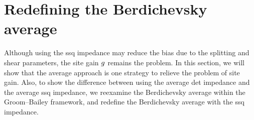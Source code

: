 \begin{comment}
		 The contribution from the MT impedance components in the 2nd and 3rd terms is generally weak, unless the very strong inductive effect, e.g., coastal effect, is recognized or the data is heavily distorted. Consequently, we may assume
	\begin{equation}
		\ZssqDistortedExGain \approx \ZssqUndistorted
	\end{equation}
		The virtue of the ssq impedance appears when the Earth is 1D, where the impedance tensor is anti-symmetric (Eq. \ref{eq:z_cond_1d}). 
		The 2nd and 3rd terms in Eq. \eqref{eq:zssq_distorted_gtes_exgain} then vanish, and the distorted ssq impedance becomes
		\begin{equation}
			\ZssqDistorted = \gain \ZssqUndistorted.
		\end{equation}
		The observed ssq impedance is only affected by the site gain.
		In general, the ssq impedance is less biased by the distortion parameters, which is in contrast to the det impedance that is always biased downward by the shear and splitting parameters. 
		According to these findings, we derive two implications -- estimating the regional 1D impedance and the galvanic distortion-related indicators -- from the det and ssq impedances. 

\end{comment}

	

\section{Redefining the Berdichevsky average}\label{sect:berdichevsky_redefined}
	Although using the ssq impedance may reduce the bias due to the splitting and shear parameters, the site gain $g$ remains the problem. 
	In this section, we will show that the average approach is one strategy to relieve the problem of site gain.
	Also, to show the difference between using the average det impedance and the average ssq impedance, we reexamine the Berdichevsky average within the Groom--Bailey framework, and redefine the Berdichevsky average with the ssq impedance.	

